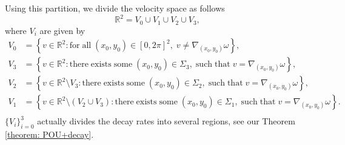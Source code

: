 \documentclass[12pt]{amsart}
\newcommand{\R}{\mathbb{R}}
\def\d{\mathrm{d}}
\begin{document}
Using this partition, we divide the velocity space as follows
\begin{equation*}
    \R^{2}=V_{0}\cup V_{1}\cup V_{2}\cup V_{3},
\end{equation*}
where $V_{i}$ are given by
\begin{equation}\label{def: Vi}
	\begin{aligned}
        V_{0}&=\left\{v\in\R^{2}:\mathrm{for\;all}\;\left(x_{0},y_{0}\right)\in\left[0,2\pi\right]^{2},\;v\neq\nabla_{\left(x_{0},y_{0}\right)}\omega\right\},\\
		V_{3}&=\left\{v\in\R^{2}:\mathrm{there\;exists\;some}\;\left(x_{0},y_{0}\right)\in \Sigma_{3},\;\mathrm{such\;that}\;v=\nabla_{\left(x_{0},y_{0}\right)}\omega\right\},\\
        V_{2}&=\left\{v\in\R^{2}\setminus V_{3}:\mathrm{there\;exists\;some}\;\left(x_{0},y_{0}\right)\in \Sigma_{2},\;\mathrm{such\;that}\;v=\nabla_{\left(x_{0},y_{0}\right)}\omega\right\},\\
        V_{1}&=\left\{v\in\R^{2}\setminus \left(V_{2}\cup V_{3}\right):\mathrm{there\;exists\;some}\;\left(x_{0},y_{0}\right)\in \Sigma_{1},\;\mathrm{such\;that}\;v=\nabla_{\left(x_{0},y_{0}\right)}\omega\right\}.\\
	\end{aligned}
\end{equation}
$\{V_{i}\}_{i=0}^{3}$ actually divides the decay rates into several regions, see our Theorem \ref{theorem: POU+decay}.

\end{document}
